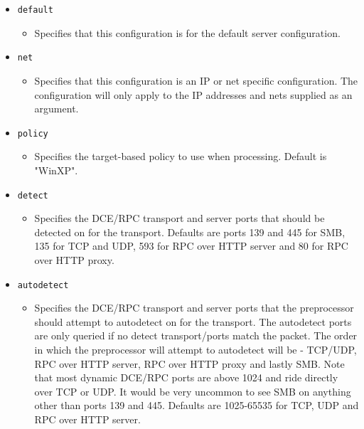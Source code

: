 \documentclass[english]{report}
\begin{document}
\begin{itemize}
\item[] \texttt{default}

\begin{itemize}

\item[] Specifies that this configuration is for the default server
configuration.

\end{itemize}

\item[] \texttt{net}

\begin{itemize}

\item[] Specifies that this configuration is an IP or net specific
configuration. The configuration will only apply to the IP addresses and nets
supplied as an argument.

\end{itemize}

\item[] \texttt{policy}

\begin{itemize}

\item[] Specifies the target-based policy to use when processing.  Default is
"WinXP".

\end{itemize}

\item[] \texttt{detect}

\begin{itemize}

\item[] Specifies the DCE/RPC transport and server ports that should be
detected on for the transport.  Defaults are ports 139 and 445 for SMB, 135 for
TCP and UDP, 593 for RPC over HTTP server and 80 for RPC over HTTP proxy. 

\end{itemize}

\item[] \texttt{autodetect}

\begin{itemize}

\item[] Specifies the DCE/RPC transport and server ports that the preprocessor
should attempt to autodetect on for the transport. The autodetect ports are
only queried if no detect transport/ports match the packet. The order in which
the preprocessor will attempt to autodetect will be - TCP/UDP, RPC over HTTP
server, RPC over HTTP proxy and lastly SMB.  Note that most dynamic DCE/RPC
ports are above 1024 and ride directly over TCP or UDP.  It would be very
uncommon to see SMB on anything other than ports 139 and 445.  Defaults are
1025-65535 for TCP, UDP and RPC over HTTP server.


\end{itemize}
\end{itemize}
\end{document}
